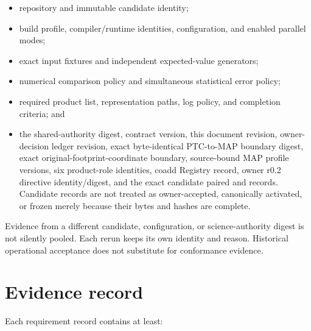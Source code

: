 \documentclass[10pt]{article}
\begin{document}
\begin{itemize}
\item repository and immutable candidate identity;
\item build profile, compiler/runtime identities, configuration, and enabled
parallel modes;
\item exact input fixtures and independent expected-value generators;
\item numerical comparison policy and simultaneous statistical error policy;
\item required product list, representation paths, log policy, and completion
criteria; and
\item the shared-authority digest, contract version, this document revision,
owner-decision ledger revision, exact byte-identical PTC-to-MAP boundary
digest, exact original-footprint-coordinate boundary, source-bound MAP
profile versions, six product-role identities, coadd Registry record, owner
r0.2 directive identity/digest, and the exact candidate paired
\SCIMapCandidateVALRegistry{} and \SCIMapCandidateVALSourceRegister{} records.
Candidate records are not treated as owner-accepted, canonically activated, or
frozen merely because their bytes and hashes are complete.
\end{itemize}

Evidence from a different candidate, configuration, or science-authority
digest is not silently pooled. Each rerun keeps its own identity and reason.
Historical operational acceptance does not substitute for conformance
evidence.

\SCIMapLifecycleDefinition

\SCIMapLifecycleTable

\SCIMapAxisSeparationDefinition

\section{Evidence record}

Each requirement record contains at least:
\end{document}
